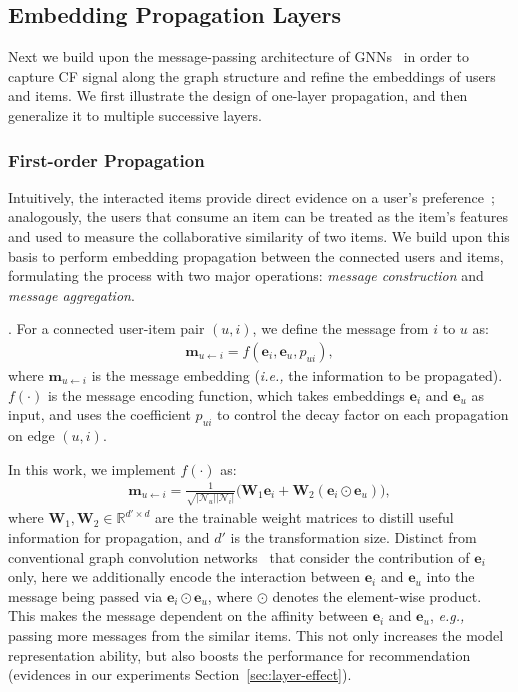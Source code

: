 \documentclass[sigconf]{acmart}
\newcommand{\Mat}[1]{\mathbf{#1}}
\newcommand{\Space}[1]{\mathbb{#1}}
\newcommand{\Set}[1]{\mathcal{#1}}
\newcommand{\ie}{\emph{i.e., }}
\newcommand{\eg}{\emph{e.g., }}
\theoremstyle{definition}
\begin{document}
\subsection{Embedding Propagation Layers}
Next we build upon the message-passing architecture of GNNs~\cite{GraphSAGE,JumpKG} in order to capture CF signal along the graph structure and refine the embeddings of users and items. We first illustrate the design of one-layer propagation, and then generalize it to multiple successive layers. 

\subsubsection{\textbf{First-order Propagation}}
Intuitively, the interacted items provide direct evidence on a user's preference~\cite{DeepICF,FISM};
analogously, the users that consume an item can be treated as the item's features and used to measure the collaborative similarity of two items.
We build upon this basis to perform embedding propagation between the connected users and items, formulating the process with two major operations: \emph{message construction} and \emph{message aggregation}. 

\vspace{+5pt}
.
For a connected user-item pair $(u,i)$, we define the message from $i$ to $u$ as:
\begin{gather}
	\Mat{m}_{u\leftarrow i}=f(\Mat{e}_{i},\Mat{e}_{u},p_{ui}),
\end{gather}
where $\Mat{m}_{u\leftarrow i}$ is the message embedding (\ie the information to be propagated). $f(\cdot)$ is the message encoding function, which takes embeddings $\Mat{e}_{i}$ and $\Mat{e}_{u}$ as input, and uses the coefficient $p_{ui}$ to control the decay factor on each propagation on edge $(u,i)$.

In this work, we implement $f(\cdot)$ as:
\begin{gather}\label{equ:0-message}
	\Mat{m}_{u\leftarrow i}=\frac{1}{\sqrt{|\Set{N}_{u}||\Set{N}_{i}|}}\Big(\Mat{W}_{1}\Mat{e}_{i} + \Mat{W}_{2}(\Mat{e}_{i}\odot\Mat{e}_{u})\Big),
\end{gather}
where $\Mat{W}_1,\Mat{W}_2\in\Space{R}^{d'\times d}$ are the trainable weight matrices to distill useful information for propagation, and $d'$ is the transformation size.
Distinct from conventional graph convolution networks~\cite{FirstGCN,GCN,PinSage,GC-MC} that consider the contribution of $\Mat{e}_i$ only, here we additionally encode the interaction between $\Mat{e}_i$ and $\Mat{e}_u$ into the message being passed via $\Mat{e}_i\odot\Mat{e}_u$, where $\odot$ denotes the element-wise product.
This makes the message dependent on the affinity between $\Mat{e}_{i}$ and $\Mat{e}_{u}$, \eg passing more messages from the similar items. This not only increases the model representation ability,
but also boosts the performance for recommendation (evidences in our experiments Section~\ref{sec:layer-effect}). 
\end{document}
